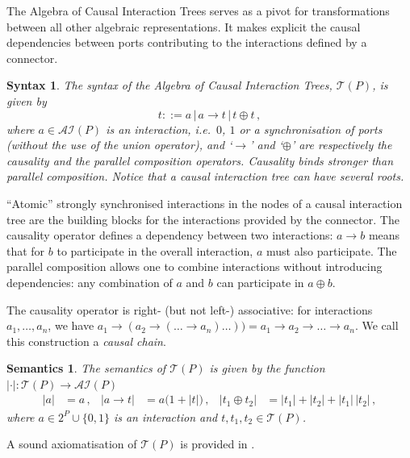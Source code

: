 \documentclass{llncs}
\newcommand{\ie}[1][\ ]{i.e.#1}
\newtheorem*{syntax}{Syntax}
\newtheorem*{semantics}{Semantics}
\newcommand{\ai}{\ensuremath{\mathcal{AI}}}
\newcommand{\ct}{\ensuremath{\mathcal{T}}}
\begin{document}
The Algebra of Causal Interaction Trees serves as a pivot for
transformations between all other algebraic representations.  It makes
explicit the causal dependencies between ports contributing to the
interactions defined by a connector.  

\begin{syntax}
The syntax of the \emph{Algebra of Causal Interaction Trees}, $\ct(P)$, is
given by
\begin{equation} \label{eq:ctsyn}
  t ::= a \,|\, a \rightarrow t \,|\, t\oplus t\,,
\end{equation}
where $a \in \ai(P)$ is an interaction, \ie $0$, $1$ or a
synchronisation of ports (without the use of the union operator), and
`$\rightarrow$' and `$\oplus$' are respectively the {\em causality}
and the {\em parallel composition} operators.  Causality binds
stronger than parallel composition.  Notice that a causal interaction
tree can have several roots.
\end{syntax}

``Atomic'' strongly synchronised interactions in the nodes of a causal
interaction tree are the building blocks for the interactions provided
by the connector.  The causality operator defines a dependency between
two interactions: $a \rightarrow b$ means that for $b$ to
participate in the overall interaction, $a$ must also participate.
The parallel composition allows one to combine interactions without
introducing dependencies: any combination of $a$
and $b$ can participate in $a \oplus b$.

The causality operator is right- (but not left-) associative: for
interactions $a_1,\dots,a_n$, we have $a_1 \rightarrow (a_2
\rightarrow (\dots \rightarrow a_n)\dots)) = a_1 \rightarrow a_2
\rightarrow \dots \rightarrow a_n$.  We call this construction a {\em
  causal chain}.

\begin{semantics}
The semantics of $\ct(P)$ is given by the function $|\cdot|: \ct(P)
\rightarrow \ai(P)$
\begin{align}
  \label{eq:ctsem}
  |a| & = a\,,
  & |a \rightarrow t| & = a\Big(1 + |t|\Big)\,,
  & |t_1 \oplus t_2| & = |t_1| + |t_2| + |t_1|\,|t_2|\,,
\end{align}
where $a\in 2^P \cup \{0,1\}$ is an interaction and $t, t_1, t_2 \in \ct(P)$.
\end{semantics}

A sound axiomatisation of $\ct(P)$ is provided in
\cite{BliSif10-causal-fmsd}. 

\end{document}
